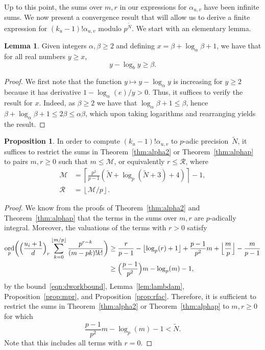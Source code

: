 \documentclass[a4paper,11pt]{article}
\numberwithin{equation}{section}
\providecommand{\floor}[1]{\left\lfloor#1\right\rfloor}   %
\providecommand{\floorBig}[1]{\Bigl\lfloor#1\Bigr\rfloor} %
\providecommand{\ceil}[1]{\left\lceil#1\right\rceil}   %
\DeclareMathOperator{\ord}{ord}          %
\theoremstyle{definition}
\newtheorem{lem}[thm]{Lemma}
\newtheorem{prop}[thm]{Proposition}
\begin{document}
Up to this point, the sums over $m,r$ in our expressions 
for $\alpha_{u,v}$ have been infinite sums.  We now present 
a convergence result that will allow us to derive a finite 
expression for $(k_u-1)!\alpha_{u,v}$ modulo $p^{\tilde{N}}$.
We start with an elementary lemma.

\begin{lem} \label{lem:log}
Given integers $\alpha,\beta \geq 2$ and defining $x = \beta + \log_{\alpha} \beta + 1$, 
we have that for all real numbers $y \geq x$, 
\begin{equation*}
y - \log_b y \geq \beta.
\end{equation*}
\end{lem}

\begin{proof}
We first note that the function $y \mapsto y - \log_{\alpha} y$ is increasing 
for $y \geq 2$ because it has derivative $1 - \log_{\alpha}(e)/y > 0$.  Thus, it 
suffices to verify the result for $x$.  Indeed, as $\beta \geq 2$ we have 
that $\log_{\alpha} \beta + 1 \leq \beta$, hence 
$\beta + \log_{\alpha} \beta + 1 \leq 2 \beta \leq \alpha \beta$,
which upon taking logarithms and rearranging yields the result.
\end{proof}


\begin{prop} \label{prop:MR}
In order to compute $(k_u-1)!\alpha_{u,v}$ to $p$-adic precision~$\tilde{N}$, 
it suffices to restrict the sums in Theorem~\ref{thm:alpha2} or 
Theorem~\ref{thm:alphap} to pairs $m,r \geq 0$ such that $m \leq \mathcal{M}$, 
or equivalently $r \leq \mathcal{R}$, where 
\begin{align*}
\mathcal{M} &= \ceil{\frac{p^2}{p-1}(\tilde{N}+\log_p(\tilde{N}+3)+4)} - 1, \\
\mathcal{R} &= \floor{\mathcal{M}/p}.
\end{align*}
\end{prop}

\begin{proof}
We know from the proofs of Theorem~\ref{thm:alpha2} and 
Theorem~\ref{thm:alphap} that the terms in the sums over $m,r$ are 
$p$-adically integral. Moreover, the valuations of the terms with 
$r > 0$ satisfy
\begin{align*}
\ord_p \biggl( \Bigl( \frac{u_i+1}{d} \Bigr)_r 
               \sum_{k=0}^{\floor{m/p}} \frac{p^{r-k}}{(m-pk)!k!} \biggr) 
&\geq \frac{r}{p-1} - \floor{\log_p(r)+1} 
      + \frac{p-1}{p^2} m + \floorBig{\frac{m}{p}} - \frac{m}{p-1} \\
&\geq \Bigl( \frac{p-1}{p^2} \Bigr) m - \log_p(m) - 1,
\end{align*}
by the bound~\eqref{eqn:dworkbound}, Lemma~\ref{lem:lambdam}, 
Proposition~\ref{prop:mpr}, and Proposition~\ref{prop:rfac}. 
Therefore, it is sufficient to restrict the sums in Theorem~\ref{thm:alpha2} 
or Theorem~\ref{thm:alphap} to $m,r \geq 0$ for which 
\begin{equation*}
\frac{p-1}{p^2} m - \log_p(m) - 1 < \tilde{N}.
\end{equation*}
Note that this includes all terms with $r = 0$.
\end{proof}
\end{document}
